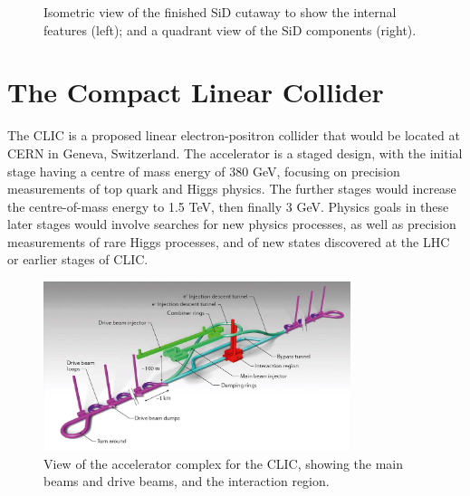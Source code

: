 \begin{figure}[p]%
	\centering
    \qquad
    \caption{Isometric view of the finished \acrshort{SiD} cutaway to show the internal features (left); and a quadrant view of the \acrshort{SiD} components (right).}%
    \label{figure:colliders/ILD/double}%
\end{figure}

\section{The Compact Linear Collider}
The \acrfull{CLIC} is a proposed linear electron-positron collider that would be located at \acrshort{CERN} in Geneva, Switzerland. The accelerator is a staged design, with the initial stage having a centre of mass energy of 380 GeV, focusing on precision measurements of top quark and Higgs physics. The further stages would increase the centre-of-mass energy to 1.5 TeV, then finally 3 GeV. Physics goals in these later stages would involve searches for new physics processes, as well as precision measurements of rare Higgs processes, and of new states discovered at the LHC or earlier stages of \acrshort{CLIC}. 

\begin{figure}[h]
	\centering
	\includegraphics[width=0.8\textwidth]{../Pictures/CLIC-Render.jpg}
	\caption{View of the accelerator complex for the \acrlong{CLIC}, showing the main beams and drive beams, and the interaction region.}
	\label{figure:colliders/CLIC/main}
\end{figure}


